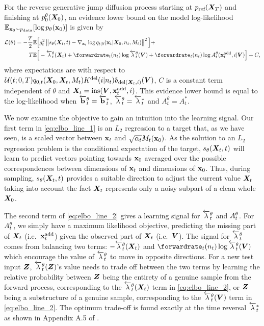 \begin{proposition}
\label{prop:elbo}
For the reverse generative jump diffusion process starting at $p_{\textup{ref}}({\bm{X}}_T)$ and finishing at $ p_0^\theta({\bm{X}}_0)$, an evidence lower bound on the model log-likelihood $ \mathbb{E}_{{\mathbf{x}}_0 \sim p_{\rm{data}}} [ \log p_\theta({\mathbf{x}}_0) ]$ is given by
\begin{align}
    \label{eq:elbo_line_1}
    \mathcal{L}(\theta) = -\frac{T}{2} \mathbb{E}\Big[& \diffcoeff_t^2 \norm{s_\theta(\mX_t, t) - \nabla_{\rvx_t} \log q_{t|0}(\rvx_t | \mX_0, n_t, M_t)   }^2 \Big] + \\
    \label{eq:elbo_line_2}
    T \mathbb{E} \Big[& - \backwardrate_{t}^\theta(\mX_t) + \forwardrate_t (n_t) \log \backwardrate_{t}^\theta(\mV) + \forwardrate_t(n_t) \log \autonet_{t}^\theta(\xadd_t, i | \mV) \Big] + C,
\end{align}
where expectations are with respect to $\mathcal{U}(t; 0, T) q_{0,t}({\bm{X}}_0, {\bm{X}}_t, M_t) K^{\textup{del}}(i | n_t) \updelta_{\textup{del}({\bm{X}}_t, i)} ({\bm{V}})$, $C$ is a constant term independent of $\theta$ and ${\bm{X}}_t = \text{ins}({\bm{V}}, {\mathbf{x}}^{\textup{add}}_t, i)$.
This evidence lower bound is equal to the log-likelihood when $\overleftarrow{\mathbf{b}}_t^\theta = \overleftarrow{\mathbf{b}}_t^*$, $\overleftarrow{\lambda}_t^\theta = \overleftarrow{\lambda}_t^*$ and $A_t^\theta = A_t^*$.

\end{proposition}


We now examine the objective to gain an intuition into the learning signal.
Our first term in \cref{eq:elbo_line_1} is an $L_2$ regression to a target that, as we have seen, is a scaled vector between ${\mathbf{x}}_t$ and $\sqrt{\alpha_t}M_t({\mathbf{x}}_0)$.
As the solution to an $L_2$ regression problem is the conditional expectation of the target, $s_\theta({\bm{X}}_t, t)$ will learn to predict vectors pointing towards ${\mathbf{x}}_0$ averaged over the possible correspondences between dimensions of ${\mathbf{x}}_t$ and dimensions of ${\mathbf{x}}_0$.
Thus, during sampling, $s_\theta({\bm{X}}_t, t)$ provides a suitable direction to adjust the current value ${\bm{X}}_t$ taking into account the fact ${\bm{X}}_t$ represents only a noisy subpart of a clean whole ${\bm{X}}_0$.

The second term of \cref{eq:elbo_line_2} gives a learning signal for $\overleftarrow{\lambda}_{t}^\theta$ and $A_{t}^\theta$.
For $A_{t}^\theta$, we simply have a maximum likelihood objective, predicting the missing part of ${\bm{X}}_t$ (i.e.~${\mathbf{x}}^{\textup{add}}_t$) given the observed part of ${\bm{X}}_t$ (i.e.~${\bm{V}}$).
The signal for $\overleftarrow{\lambda}_{t}^\theta$ comes from balancing two terms: $-\overleftarrow{\lambda}_{t}^\theta({\bm{X}}_t)$ and $\forwardrate_t(n_t) \log \backwardrate_{t}^\theta(\mV)$ which encourage the value of $\overleftarrow{\lambda}_{t}^\theta$ to move in opposite directions. For a new test input ${\bm{Z}}$, $\overleftarrow{\lambda}_{t}^\theta({\bm{Z}})$'s value needs to trade off between the two terms by learning the relative probability between ${\bm{Z}}$ being the entirety of a genuine sample from the forward process, corresponding to the $\overleftarrow{\lambda}_t^\theta({\bm{X}}_t)$ term in \cref{eq:elbo_line_2}, or ${\bm{Z}}$ being a substructure of a genuine sample, corresponding to the $\overleftarrow{\lambda}_t^\theta({\bm{V}})$ term in \cref{eq:elbo_line_2}. The optimum trade-off is found exactly at the time reversal $\overleftarrow{\lambda}_{t}^*$ as shown in Appendix A.5 of \citet{campbell2024trans}.

